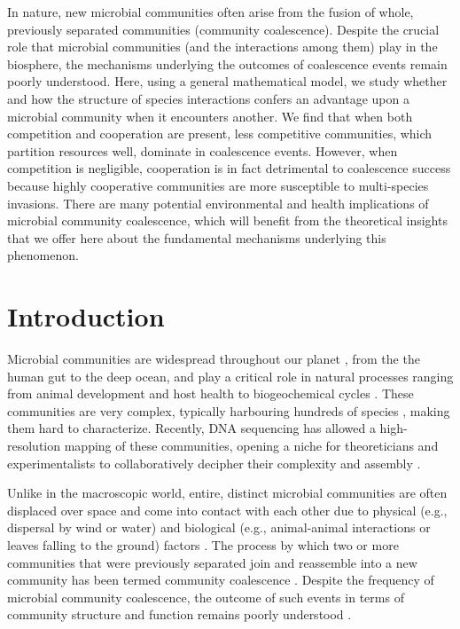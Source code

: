 \documentclass[10pt,letterpaper]{article}
\begin{document}
In nature, new microbial communities often arise from the fusion of whole, previously separated communities (community coalescence). Despite the crucial role that microbial communities (and the interactions among them) play in the biosphere, the mechanisms underlying the outcomes of coalescence events remain poorly understood. Here, using a general mathematical model, we study whether and how the structure of species interactions confers an advantage upon a microbial community when it encounters another. We find that when both competition and cooperation are present, less competitive communities, which partition resources well, dominate in coalescence events. However, when competition is negligible, cooperation is in fact detrimental to coalescence success because highly cooperative communities are more susceptible to multi-species invasions. There are many potential environmental and health implications of microbial community coalescence, which will benefit from the theoretical insights that we offer here about the fundamental mechanisms underlying this phenomenon.

\linenumbers

\section*{Introduction}

Microbial communities are widespread throughout our planet \cite{Fierer2006}, from the the human gut to the deep ocean, and play a critical role in natural processes ranging from animal development and host health \cite{Huttenhower2012, McFall-Ngai2013} to biogeochemical cycles \cite{Falkowski2008}. These communities are very complex, typically harbouring hundreds of species \cite{Gilbert2014}, making them hard to characterize. Recently, DNA sequencing has allowed a high-resolution mapping of these communities, opening a niche for theoreticians and experimentalists to collaboratively decipher their complexity and assembly \cite{Costello2012,Friedman2017,Goldford2018,Goyal2018,Marsland2019,Vila2019,Estrela2020,Coyte2021,Fant2021}.

Unlike in the macroscopic world, entire, distinct microbial communities are often displaced over space and come into contact with each other due to physical (e.g., dispersal by wind or water) and biological (e.g., animal-animal interactions or leaves falling to the ground) factors \cite{Kort2014, Evans2020,Luo2020, Vass2021}. The process by which two or more communities that were previously separated join and reassemble into a new community has been termed community coalescence \cite{Rillig2015}. Despite the frequency of microbial community coalescence, the outcome of such events in terms of community structure and function remains poorly understood \cite{Rillig2016b}.
\end{document}
